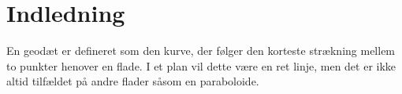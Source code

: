\section{Indledning}
En geodæt er defineret som den kurve, der følger den korteste strækning mellem to punkter henover en flade. I et plan vil dette være en ret linje, men det er ikke altid tilfældet på andre flader såsom en paraboloide.  